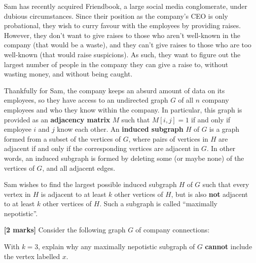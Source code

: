 \documentclass{article}
\begin{document}
\setcounter{question}{1}

\begin{Question}

Sam has recently acquired Friendbook, a large social media conglomerate, under dubious circumstances. Since their position as the company's CEO is only probational, they wish to curry favour with the employees by providing raises. However, they don't want to give raises to those who aren't well-known in the company (that would be a waste), and they can't give raises to those who are too well-known (that would raise suspicions). As such, they want to figure out the largest number of people in the company they can give a raise to, without wasting money, and without being caught.

Thankfully for Sam, the company keeps an absurd amount of data on its employees, so they have access to an undirected graph \(G\) of all \(n\) company employees and who they know within the company. In particular, this graph is provided as an \textbf{adjacency matrix} \(M\) such that \(M[i, j] = 1\) if and only if employee \(i\) and \(j\) know each other. An \textbf{induced subgraph} \(H\) of \(G\) is a graph formed from a subset of the vertices of \(G\), where pairs of vertices in \(H\) are adjacent if and only if the corresponding vertices are adjacent in \(G\). In other words, an induced subgraph is formed by deleting some (or maybe none) of the vertices of \(G\), and all adjacent edges.

Sam wishes to find the largest possible induced subgraph \(H\) of \(G\) such that every vertex in \(H\) is adjacent to at least \(k\) other vertices of \(H\), but is also \textbf{not} adjacent to at least \(k\) other vertices of \(H\). Such a subgraph is called ``maximally nepotistic''.

\begin{Subquestion} \label{q:nepo-graph-expl} \textbf{[2 marks]}
    Consider the following graph \(G\) of company connections:
    \begin{center}
    \end{center}
    With \(k = 3\), explain why any maximally nepotistic subgraph of \(G\) \textbf{cannot} include the vertex labelled \(x\).


\end{Subquestion}
\end{Question}
\end{document}

